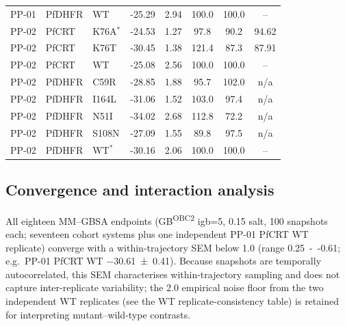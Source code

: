 \documentclass[journal=jcisd8,manuscript=suppinfo,layout=traditional]{achemso}
\begin{document}
\begin{table}[htbp]
\begin{tabularx}{\textwidth}{l l l S[table-format=-2.2] S[table-format=1.2] S[table-format=3.1] S[table-format=3.1] S[table-format=3.2]}
PP-01 & PfDHFR & WT & -25.29 & 2.94 & 100.0 & 100.0 & {--} \\
PP-02 & PfCRT & K76A$^\ast$ & -24.53 & 1.27 & 97.8 & 90.2 & 94.62 \\
PP-02 & PfCRT & K76T & -30.45 & 1.38 & 121.4 & 87.3 & 87.91 \\
PP-02 & PfCRT & WT & -25.08 & 2.56 & 100.0 & 100.0 & {--} \\
PP-02 & PfDHFR & C59R & -28.85 & 1.88 & 95.7 & 102.0 & n/a \\
PP-02 & PfDHFR & I164L & -31.06 & 1.52 & 103.0 & 97.4 & n/a \\
PP-02 & PfDHFR & N51I & -34.02 & 2.68 & 112.8 & 72.2 & n/a \\
PP-02 & PfDHFR & S108N & -27.09 & 1.55 & 89.8 & 97.5 & n/a \\
PP-02 & PfDHFR & WT$^\ast$ & -30.16 & 2.06 & 100.0 & 100.0 & {--} \\
\bottomrule
\end{tabularx}
\setlength{\tabcolsep}{6pt}
\end{table}



\subsection*{Convergence and interaction analysis}
All eighteen MM--GBSA endpoints (GB\textsuperscript{OBC2} igb=5, \qty{0.15}{\molar} salt, \num{100} snapshots each; seventeen cohort systems plus one independent PP-01 PfCRT WT replicate) converge with a within-trajectory SEM below \qty{1.0}{\kcalmol} (range \qty{0.25}{--}\qty{0.61}{\kcalmol}; e.g.\ PP-01 PfCRT WT \qty{-30.61\pm0.41}{\kcalmol}). Because snapshots are temporally autocorrelated, this SEM characterises within-trajectory sampling and does not capture inter-replicate variability; the \qty{2.0}{\kcalmol} empirical noise floor from the two independent WT replicates (see the WT replicate-consistency table) is retained for interpreting mutant--wild-type contrasts.
\end{document}

